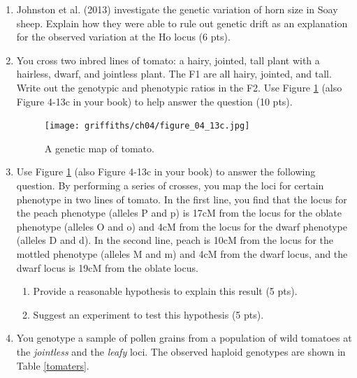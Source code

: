 \documentclass[]{article}
\begin{document}
\begin{enumerate}
\newpage
\item Johnston et al. (2013) investigate the genetic variation of horn size in Soay sheep. Explain how they were able to rule out genetic drift as an explanation for the observed variation at the Ho locus (6 pts).

\newpage
\item You cross two inbred lines of tomato: a hairy, jointed, tall plant with a hairless, dwarf, and jointless plant.  The F1 are all hairy, jointed, and tall.  Write out the genotypic and phenotypic ratios in the F2. Use Figure \ref{map} (also Figure 4-13c in your book) to help answer the question (10 pts).

\begin{figure}[h]
  \begin{center}
   \texttt{[image: griffiths/ch04/figure\_04\_13c.jpg]}
    \caption{A genetic map of tomato. } 
\label{map}
  \end{center}
\end{figure}


\newpage
\item Use Figure \ref{map} (also Figure 4-13c in your book) to answer the following question.  By performing a series of crosses, you map the loci for certain phenotype in two lines of tomato.  In the first line, you find that the locus for the peach phenotype (alleles P and p) is 17cM from the locus for the oblate phenotype (alleles O and o) and 4cM from the locus for the dwarf phenotype (alleles D and d). In the second line, peach is 10cM from the locus for the mottled phenotype (alleles M and m) and 4cM from the dwarf locus, and the dwarf locus is 19cM from the oblate locus. 
\begin{enumerate}
\item Provide a reasonable hypothesis to explain this result (5 pts).
\item Suggest an experiment to test this hypothesis (5 pts).
\end{enumerate}

\newpage
\item You genotype a sample of pollen grains from a population of wild tomatoes at the \emph{jointless} and the \emph{leafy} loci. The observed haploid genotypes are shown in Table \ref{tomaters}. 


\end{enumerate}
\end{document}

